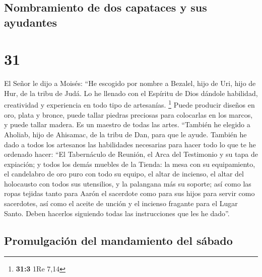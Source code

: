 \hypertarget{nombramiento-de-dos-capataces-y-sus-ayudantes}{%
\subsection{Nombramiento de dos capataces y sus
ayudantes}\label{nombramiento-de-dos-capataces-y-sus-ayudantes}}

\hypertarget{section-30}{%
\section{31}\label{section-30}}

 El Señor le dijo a Moisés:  ``He escogido
por nombre a Bezalel, hijo de Uri, hijo de Hur, de la tribu de Judá.
 Lo he llenado con el Espíritu de Dios dándole habilidad,
creatividad y experiencia en todo tipo de artesanías. \footnote{\textbf{31:3}
  1Re 7,14}  Puede producir diseños en oro, plata y
bronce,  puede tallar piedras preciosas para colocarlas en
los marcos, y puede tallar madera. Es un maestro de todas las artes.
 ``También he elegido a Aholiab, hijo de Ahisamac, de la
tribu de Dan, para que le ayude. También he dado a todos los artesanos
las habilidades necesarias para hacer todo lo que te he ordenado hacer:
 ``El Tabernáculo de Reunión, el Arca del Testimonio y su
tapa de expiación; y todos los demás muebles de la Tienda:
 la mesa con su equipamiento, el candelabro de oro puro
con todo su equipo, el altar de incienso,  el altar del
holocausto con todos sus utensilios, y la palangana más su soporte;
 así como las ropas tejidas tanto para Aarón el sacerdote
como para sus hijos para servir como sacerdotes,  así
como el aceite de unción y el incienso fragante para el Lugar Santo.
Deben hacerlos siguiendo todas las instrucciones que les he dado''.

\hypertarget{promulgaciuxf3n-del-mandamiento-del-suxe1bado}{%
\subsection{Promulgación del mandamiento del
sábado}\label{promulgaciuxf3n-del-mandamiento-del-suxe1bado}}

